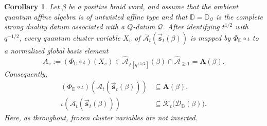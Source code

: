 \documentclass[12pt, reqno]{amsart}
\theoremstyle{plain}
\newtheorem{corollary}[theorem]{Corollary}
\theoremstyle{definition}
\numberwithin{equation}{section}
\newcommand{\ZZ}{\mathbb{Z}}
\newcommand{\DD}{\mathbb{D}}
\newcommand{\cA}{\mathcal{A}}
\begin{document}
\begin{corollary}\label{cor:right-weave-cluster-variables-level-one}
Let $\beta$ be a positive braid word, and assume that the ambient quantum affine algebra is of untwisted affine
type and that \(\DD=\DD_{\mathcal Q}\) is the complete strong duality
datum associated with a \(Q\)-datum \(\mathcal Q\). After identifying $t^{1/2}$ with $q^{-1/2}$, every
quantum cluster variable $X_v$ of
$\overline{\mathcal A}_t(\overrightarrow{\mathbf s}_t(\beta))$ is mapped by
$\Phi_{\DD}\circ\iota$ to a normalized global basis element
\begin{equation*}
    A_v:=(\Phi_{\DD}\circ\iota)(X_v)
    \in\widehat{\cA}_{\ZZ[q^{\pm1/2}]}(\beta)
       \cap\widehat{\cA}_{\geq1}
    =\mathbf A(\beta).
\end{equation*}
Consequently,
\begin{align}
    (\Phi_{\DD}\circ\iota)\!
    \left(
        \overline{\mathcal A}_t
        (\overrightarrow{\mathbf s}_t(\beta))
    \right)
    &\subseteq \mathbf A(\beta),
    \label{eq:right-weave-cluster-algebra-in-A-beta}\\
    \iota\!
    \left(
        \overline{\mathcal A}_t
        (\overrightarrow{\mathbf s}_t(\beta))
    \right)
    &\subseteq
    \mathcal{K}_t\bigl(\mathscr D_{\DD}(\beta)\bigr).
    \label{eq:right-weave-cluster-algebra-in-D-beta}
\end{align}
Here, as throughout, frozen cluster variables are not inverted.
\end{corollary}
\end{document}
